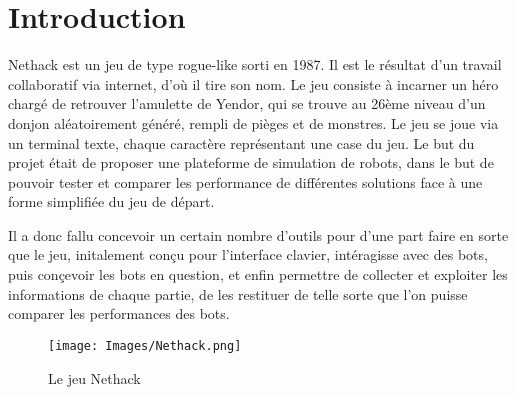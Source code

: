 \chapter*{Introduction}

Nethack est un jeu de type rogue-like sorti en 1987. Il est le résultat d'un travail collaboratif via internet, d'où il tire son nom. Le jeu consiste à incarner un héro chargé de retrouver l'amulette de Yendor, qui se trouve au 26ème niveau d'un donjon aléatoirement généré, rempli de pièges et de monstres. Le jeu se joue via un terminal texte, chaque caractère représentant une case du jeu. Le but du projet était de proposer une plateforme de simulation de robots, dans le but de pouvoir tester et comparer les performance de différentes solutions face à une forme simplifiée du jeu de départ. 

Il a donc fallu concevoir un certain nombre d'outils pour d'une part faire en sorte que le jeu, initalement conçu pour l'interface clavier, intéragisse avec des bots, puis conçevoir les bots en question, et enfin permettre de collecter et exploiter les informations de chaque partie, de les restituer de telle sorte que l'on puisse comparer les performances des bots.


\begin{figure}[h!]
  \center
  \texttt{[image: Images/Nethack.png]}
  \caption{Le jeu Nethack}
\end{figure}

